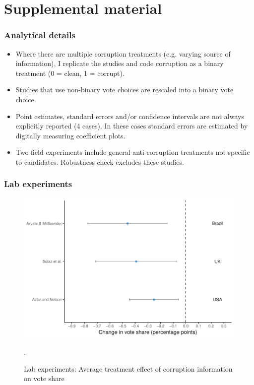 \documentclass[usenames,dvipsnames]{beamer}
\begin{document}
\appendix

\section{Supplemental material}

\begin{frame}[label=details]
\frametitle{Analytical details \hyperlink{methods}{}}
\begin{itemize}
\item Where there are multiple corruption treatments (e.g. varying source of information), I replicate the studies and code corruption as a binary treatment (0 = clean, 1 = corrupt).
\pause
\item Studies that use non-binary vote choices are rescaled into a binary vote choice.
\pause
\item Point estimates, standard errors and/or confidence intervals are not always explicitly reported (4 cases). In these cases standard errors are estimated by digitally measuring coefficient plots.
\pause
\item Two field experiments include general anti-corruption treatments not specific to candidates. Robustness check excludes these studies. 
\end{itemize}
\end{frame}


\begin{frame}[label=lab]
\frametitle{Lab experiments \hyperlink{results}{}}

\begin{figure}[!htb]
\includegraphics[scale=0.65]{../figs/lab.pdf}
\vspace{0.2cm}
\caption{Lab experiments: Average treatment effect of corruption information on vote share}.
\small
\vspace{-0.3cm}
\label{fig: lab}
\end{figure}
\end{frame}
\end{document}
